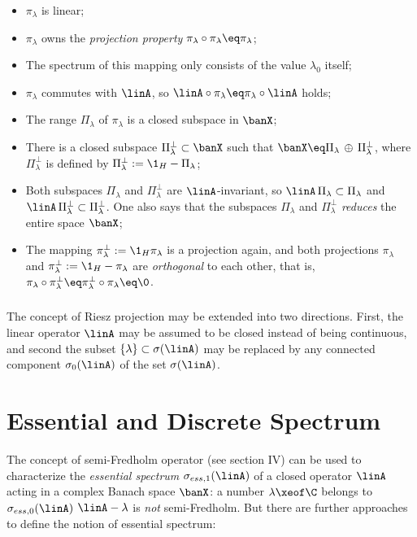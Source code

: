 \documentclass[11pt,twoside]{article}
\begin{document}
\begin{itemize}[leftmargin=12pt]
\item[1.]
$\pi_{\lambda}$ is linear;

\item[2.]
$\pi_{\lambda}$ owns the \textit{projection property}
$\pi_{\lambda} \circ \pi_{\lambda} \eq \pi_{\lambda}$;

\item[3.]
The spectrum of this mapping only consists of the value $\lambda_0$ itself;

\item[4.]
$\pi_{\lambda}$ commutes with $\linA$,
so $\linA \circ \pi_{\lambda} \eq \pi_{\lambda} \circ \linA$ holds;

\item[5.]
The range $\Pi_{\lambda}$ of $\pi_{\lambda}$ is a closed subspace in $\banX$;

\item[6.]
There is a closed subspace $\Pi_{\lambda}^{\bot} \subset \banX$
such that
$\banX \eq \Pi_{\lambda} \, \oplus \, \Pi_{\lambda}^{\bot}$,
where $\Pi_{\lambda}^{\bot}$ is defined by
$\Pi_{\lambda}^{\bot} := \1_H- \Pi_{\lambda}$;

\item[7.]
Both subspaces $\Pi_{\lambda}$ and $\Pi_{\lambda}^{\bot}$
are $\linA$-invariant, so
$\linA \, \Pi_{\lambda} \subset \Pi_{\lambda}$ and
$\linA \, \Pi_{\lambda}^{\bot} \subset \Pi_{\lambda}^{\bot}$.
One also says that the subspaces 
$\Pi_{\lambda}$ and $\Pi_{\lambda}^{\bot}$
\textit{reduces} the entire space $\banX$;

\item[8.]
The mapping $\pi_{\lambda}^{\bot} := \1_H \pi_{\lambda}$ is a projection again,
and both projections
$\pi_{\lambda}$ and
$\pi_{\lambda}^{\bot} := \1_H -\pi_{\lambda}$
are \textit{orthogonal} to each other,
that is,
$\pi_{\lambda}        \circ \pi_{\lambda}^{\bot} \eq 
 \pi_{\lambda}^{\bot} \circ \pi_{\lambda}        \eq \0$.
\end{itemize}

\subparagraph{}
The concept of {Riesz projection}  may be extended into two directions.
First,
the linear operator $\linA$ may be assumed to be closed
instead of being continuous,
and second
the subset $\{\lambda\} \subset \sigma(\linA)$ may be replaced
by any connected component $\sigma_0(\linA)$ of the set $\sigma(\linA)$.

\section{Essential and Discrete Spectrum}
The concept of semi-Fredholm operator (see section IV)
can be used to characterize the \textit{essential spectrum}
$\sigma_{ess,1}(\linA)$ of a closed operator $\linA$ acting
in a complex Banach space $\banX$:
a number $\lambda \xeof \C$ belongs to $\sigma_{ess,0}(\linA)$
\iff $\linA - \lambda$ is \textit{not} semi-Fredholm.
But there are further approaches to define the notion of essential spectrum:
\end{document}
